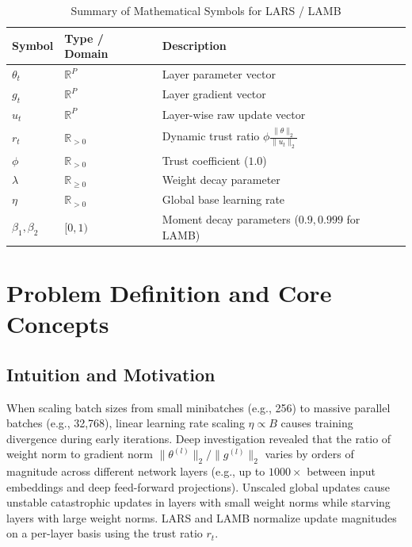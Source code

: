 \documentclass[11pt,a4paper]{article}
\theoremstyle{definition}
\begin{document}
\begin{table}[h]
\centering
\caption{Summary of Mathematical Symbols for LARS / LAMB}
\begin{tabular}{lll}
\toprule
\textbf{Symbol} & \textbf{Type / Domain} & \textbf{Description} \\
\midrule
$\theta_t$ & $\mathbb{R}^P$ & Layer parameter vector \\
$g_t$ & $\mathbb{R}^P$ & Layer gradient vector \\
$u_t$ & $\mathbb{R}^P$ & Layer-wise raw update vector \\
$r_t$ & $\mathbb{R}_{> 0}$ & Dynamic trust ratio $\phi \frac{\|\theta\|_2}{\|u_t\|_2}$ \\
$\phi$ & $\mathbb{R}_{> 0}$ & Trust coefficient ($1.0$) \\
$\lambda$ & $\mathbb{R}_{\ge 0}$ & Weight decay parameter \\
$\eta$ & $\mathbb{R}_{> 0}$ & Global base learning rate \\
$\beta_1, \beta_2$ & $[0, 1)$ & Moment decay parameters ($0.9, 0.999$ for LAMB) \\
\bottomrule
\end{tabular}
\end{table}

\section{Problem Definition and Core Concepts}

\subsection{Intuition and Motivation}
When scaling batch sizes from small minibatches (e.g., 256) to massive parallel batches (e.g., 32,768), linear learning rate scaling $\eta \propto B$ causes training divergence during early iterations. Deep investigation revealed that the ratio of weight norm to gradient norm $\|\theta^{(l)}\|_2 / \|g^{(l)}\|_2$ varies by orders of magnitude across different network layers (e.g., up to $1000\times$ between input embeddings and deep feed-forward projections). Unscaled global updates cause unstable catastrophic updates in layers with small weight norms while starving layers with large weight norms. LARS and LAMB normalize update magnitudes on a per-layer basis using the trust ratio $r_t$.
\end{document}

